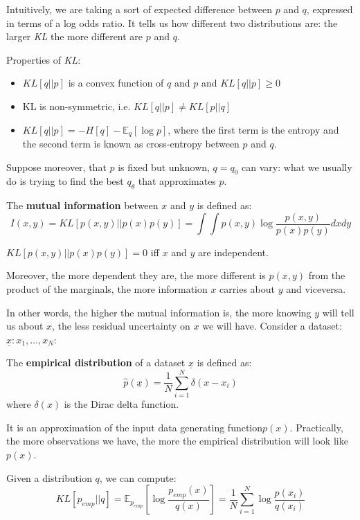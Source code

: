 Intuitively, we are taking a sort of expected difference between $p$ and $q$, expressed in terms of a log odds ratio. It tells us how different two distributions are: the larger \textit{KL} the more different are $p$ and $q$.

Properties of \textit{KL}:
\begin{itemize}
    \item $KL[q||p]$ is a convex function of $q$ and $p$ and $KL[q||p] \ge 0$
    \item KL is non-symmetric, i.e. $KL[q||p] \neq KL[p||q]$
    \item $KL[q||p] = -H[q] - \mathbb{E}_q[\log p]$, where the first term is the entropy and the second term is known as cross-entropy between $p$ and $q$.
\end{itemize}


Suppose moreover, that $p$ is fixed but unknown, $q = q_0$ can vary: what we usually do is trying to find the best $q_{\theta}$ that approximates $p$.

The \textbf{mutual information} between $x$ and $y$ is defined as:
$$
I(x,y) = KL[p(x,y)||p(x)p(y)] = \int \int p(x,y) \log \dfrac{p(x,y)}{p(x)p(y)} dx dy
$$

$KL[p(x,y)||p(x)p(y)] = 0$ iff $x$ and $y$ are independent.

Moreover, the more dependent they are, the more different is $p(x,y)$ from the product of the marginals, the more information $x$ carries about $y$ and viceversa.

In other words, the higher the mutual information is, the more knowing $y$ will tell us about $x$, the less residual uncertainty on $x$ we will have.
\newpage
Consider a dataset: $\underline{x} : x_1,\dots,x_N$:
\begin{definitionblock}
    The \textbf{empirical distribution} of a dataset $\underline{x}$ is defined as:
    $$
    \hat p(\underline{x}) = \dfrac 1N \sum_{i=1}^N \delta(x - x_i)
    $$
    where $\delta(x)$ is the Dirac delta function.
\end{definitionblock}

It is an approximation of the input data generating function$p(x)$. Practically, the more observations we have, the more the empirical distribution will look like $p(x)$.

Given a distribution $q$, we can compute:
$$
KL[p_{emp}||q] = \mathbb{E}_{p_{emp}}\left[\log \dfrac{p_{emp}(x)}{q(x)}\right] = \dfrac 1N \sum_{i=1}^N \log \dfrac{p(x_i)}{q(x_i)}
$$

